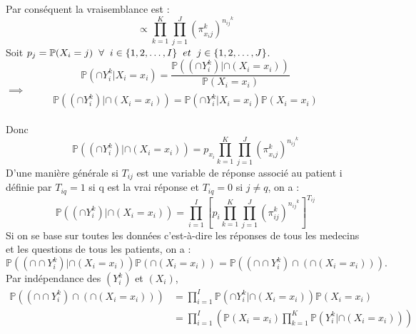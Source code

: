\documentclass[a4paper,french,10pt]{article}
\begin{document}
	Par conséquent la vraisemblance est : \[\propto \prod_{k=1}^{K} \prod_{j=1}^{J} \left(\pi_{x_ij}^k\right)^{{n_{ij}}^{k}}\]
	Soit $p_j = \mathbb{P}(X_i = j) \hspace{2mm}\forall\hspace{2mm}i \in \{1, 2, \dots,I\}\hspace{2mm} et\hspace{2mm} j \in \{1, 2, \dots,J\}$.
	\[\mathbb{P} (\cap Y_{i}^k | X_i=x_i ) = \frac{\mathbb{P} \left((\cap Y_{i}^k) | \cap(X_i=x_i) \right)}{\mathbb{P}(X_i = x_i)}\] $\implies$ \[\mathbb{P} \left((\cap Y_{i}^k) | \cap(X_i=x_i) \right) = \mathbb{P} (\cap Y_{i}^k | X_i=x_i ) \mathbb{P}(X_i = x_i)\]\\
	Donc \[\mathbb{P} \left((\cap Y_{i}^k) | \cap(X_i=x_i) \right) = p_{x_{i}} \prod_{k=1}^{K} \prod_{j=1}^{J} \left(\pi_{x_ij}^k\right)^{{n_{ij}}^{k}}\]
	D'une manière générale si $T_{ij}$ est une variable de réponse associé au patient i définie par $T_{iq} = 1$  si q est la vrai réponse et $T_{iq} = 0$ si $j \neq q$, on a :
	\[\mathbb{P} \left((\cap Y_{i}^k) | \cap(X_i=x_i) \right) = \prod_{i=1}^{I}\left[p_{i} \prod_{k=1}^{K} \prod_{j=1}^{J} \left(\pi_{ij}^k\right)^{{n_{ij}}^{k}}\right]^{T_{ij}}\]
	Si on se base sur toutes les données c'est-à-dire les réponses de tous les medecins et les questions de tous les patients, on a :
	\[\mathbb{P} \left((\cap \cap Y_{i}^k) | \cap(X_i=x_i) \right) \mathbb{P}\left(\cap (X_i = x_i)\right) = \mathbb{P} \left((\cap \cap Y_{i}^k) \cap \left(\cap(X_i=x_i)\right)  \right).\]
	Par indépendance des $(Y_{i}^k)$ et $(X_i)$, 
	\begin{align*}
		\mathbb{P} \left((\cap \cap Y_{i}^k) \cap \left(\cap(X_i=x_i)\right)  \right) &= \prod_{i=1}^{I} \mathbb{P} \left(\cap Y_{i}^k | \cap (X_i=x_i)\right) \mathbb{P}(X_i = x_i)\\
		 &= \prod_{i=1}^{I}\left(\mathbb{P}(X_i = x_i) \prod_{k=1}^{K}\mathbb{P} \left( Y_{i}^k | \cap(X_i=x_i) \right)\right)
	\end{align*}
	
	
	
	
	
	
\end{document}
